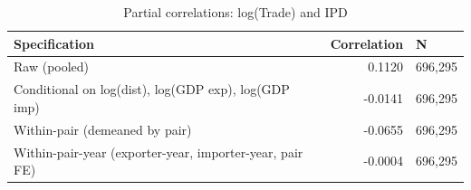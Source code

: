 \begin{table}[!h]
\centering
\caption{\label{tab:tab:partial_corr}Partial correlations: log(Trade) and IPD}
\centering
\begin{tabular}[t]{lrl}
\toprule
Specification & Correlation & N\\
\midrule
Raw (pooled) & 0.1120 & 696,295\\
Conditional on log(dist), log(GDP exp), log(GDP imp) & -0.0141 & 696,295\\
Within-pair (demeaned by pair) & -0.0655 & 696,295\\
Within-pair-year (exporter-year, importer-year, pair FE) & -0.0004 & 696,295\\
\bottomrule
\end{tabular}
\end{table}
